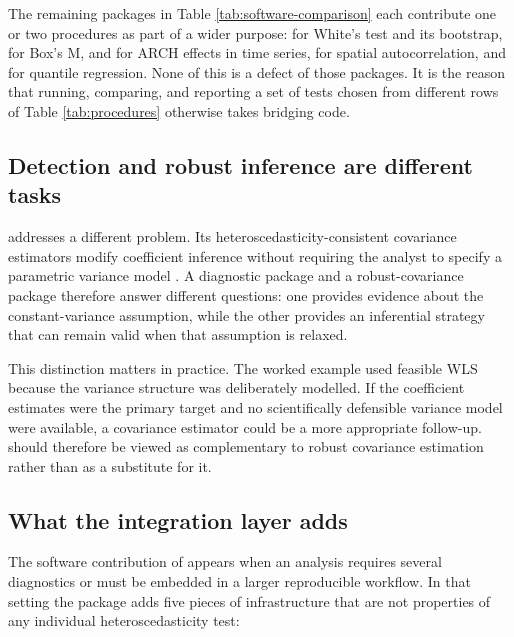 The remaining packages in Table \ref{tab:software-comparison} each contribute
one or two procedures as part of a wider purpose:  for
White's test and its bootstrap,  for Box's M,
 and  for ARCH effects in time series,
 for spatial autocorrelation, and  for
quantile regression. None of this is a defect of those packages. It is the
reason that running, comparing, and reporting a set of tests chosen from
different rows of Table \ref{tab:procedures} otherwise takes bridging code.

\subsection{Detection and robust inference are different tasks}\label{detection-and-robust-inference-are-different-tasks}

 addresses a different problem. Its
heteroscedasticity-consistent covariance estimators modify coefficient
inference without requiring the analyst to specify a parametric variance model
\citep{zeileis2006sandwich}. A diagnostic package and a robust-covariance package
therefore answer different questions: one provides evidence about the
constant-variance assumption, while the other provides an inferential strategy
that can remain valid when that assumption is relaxed.

This distinction matters in practice. The worked example used feasible WLS
because the variance structure was deliberately modelled. If the coefficient
estimates were the primary target and no scientifically defensible variance
model were available, a  covariance estimator could be a more
appropriate follow-up.  should therefore be viewed as
complementary to robust covariance estimation rather than as a substitute for
it.

\subsection{What the integration layer adds}\label{what-the-integration-layer-adds}

The software contribution of  appears when an analysis
requires several diagnostics or must be embedded in a larger reproducible
workflow. In that setting the package adds five pieces of infrastructure that
are not properties of any individual heteroscedasticity test:

